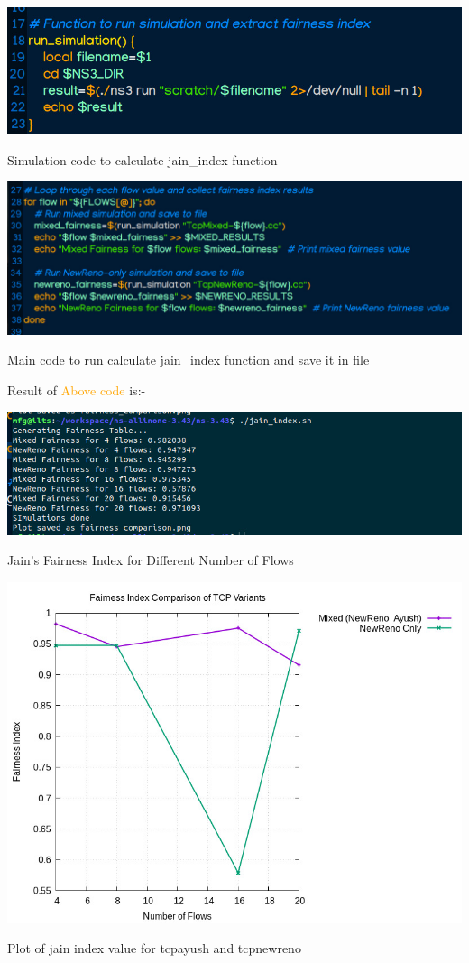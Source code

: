 \documentclass[11pt,a4paper]{article}
\begin{document}
\begin{center}
    \includegraphics[width=1\columnwidth]{images/jain-sim.jpg}
    \caption{Simulation code to calculate jain\_index function}
\end{center}

\begin{center}
    \includegraphics[width=1\columnwidth]{images/jain-sim2.jpg}
    \caption{Main code to run calculate jain\_index function and save it in file}
\end{center}

Result of \textcolor{orange}{Above code} is:-
\begin{center}
    \includegraphics[width=1\columnwidth]{images/bash-jain.jpg}
    \caption{Jain's Fairness Index for Different Number of Flows}
\end{center}
\begin{center}
    \includegraphics[width=1\columnwidth]{images/jain-res.jpg}
    \caption{Plot of jain index value for tcpayush and tcpnewreno}
\end{center}
\end{document}
